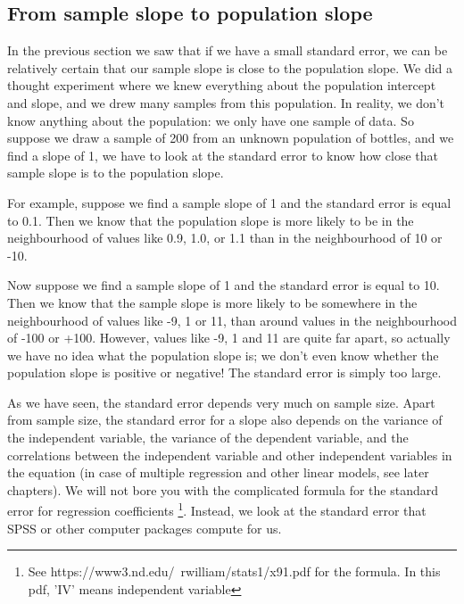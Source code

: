 \documentclass[]{report}\usepackage[]{graphicx}\usepackage[]{color}
\begin{document}
\subsection{From sample slope to population slope}

In the previous section we saw that if we have a small standard error, we can be relatively certain that our sample slope is close to the population slope. We did a thought experiment where we knew everything about the population intercept and slope, and we drew many samples from this population. In reality, we don't know anything about the population: we only have one sample of data. So suppose we draw a sample of 200 from an unknown population of bottles, and we find a slope of 1, we have to look at the standard error to know how close that sample slope is to the population slope.

For example, suppose we find a sample slope of 1 and the standard error is equal to 0.1. Then we know that the population slope is more likely to be in the neighbourhood of values like 0.9, 1.0, or 1.1 than in the neighbourhood of 10 or -10.

Now suppose we find a sample slope of 1 and the standard error is equal to 10. Then we know that the sample slope is more likely to be somewhere in the neighbourhood of values like -9, 1 or 11, than around values in the neighbourhood of -100 or +100. However, values like -9, 1 and 11 are quite far apart, so actually we have no idea what the population slope is; we don't even know whether the population slope is positive or negative! The standard error is simply too large.

As we have seen, the standard error depends very much on sample size. Apart from sample size, the standard error for a slope also depends on the variance of the independent variable, the variance of the dependent variable, and the correlations between the independent variable and other independent variables in the equation (in case of multiple regression and other linear models, see later chapters). We will not bore you with the complicated formula for the standard error for regression coefficients \footnote{See https://www3.nd.edu/~rwilliam/stats1/x91.pdf for the formula. In this pdf, 'IV' means independent variable}. Instead, we look at the standard error that SPSS or other computer packages compute for us.
\end{document}
